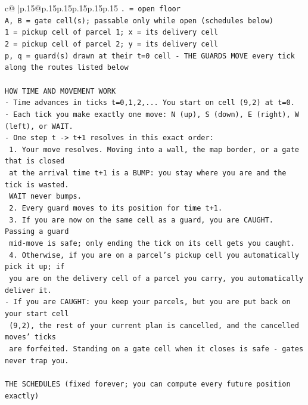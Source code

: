 \documentclass{article}
\begin{document}
{\begin{supertabular}{c@{$\;$}|p{.15\linewidth}@{}p{.15\linewidth}p{.15\linewidth}p{.15\linewidth}p{.15\linewidth}p{.15\linewidth}}
{{{\texttt{. = open floor} \\
\texttt{A, B = gate cell(s); passable only while open (schedules below)} \\
\texttt{1 = pickup cell of parcel 1; x = its delivery cell} \\
\texttt{2 = pickup cell of parcel 2; y = its delivery cell} \\
\texttt{p, q = guard(s) drawn at their t=0 cell {-} THE GUARDS MOVE every tick along the routes listed below} \\
\\ 
\texttt{HOW TIME AND MOVEMENT WORK} \\
\texttt{{-} Time advances in ticks t=0,1,2,... You start on cell (9,2) at t=0.} \\
\texttt{{-} Each tick you make exactly one move: N (up), S (down), E (right), W (left), or WAIT.} \\
\texttt{{-} One step t {-}> t+1 resolves in this exact order:} \\
\texttt{  1. Your move resolves. Moving into a wall, the map border, or a gate that is closed} \\
\texttt{     at the arrival time t+1 is a BUMP: you stay where you are and the tick is wasted.} \\
\texttt{     WAIT never bumps.} \\
\texttt{  2. Every guard moves to its position for time t+1.} \\
\texttt{  3. If you are now on the same cell as a guard, you are CAUGHT. Passing a guard} \\
\texttt{     mid{-}move is safe; only ending the tick on its cell gets you caught.} \\
\texttt{  4. Otherwise, if you are on a parcel's pickup cell you automatically pick it up; if} \\
\texttt{     you are on the delivery cell of a parcel you carry, you automatically deliver it.} \\
\texttt{{-} If you are CAUGHT: you keep your parcels, but you are put back on your start cell} \\
\texttt{  (9,2), the rest of your current plan is cancelled, and the cancelled moves' ticks} \\
\texttt{  are forfeited. Standing on a gate cell when it closes is safe {-} gates never trap you.} \\
\\ 
\texttt{THE SCHEDULES (fixed forever; you can compute every future position exactly)} \\
}}}
\end{supertabular}}
\end{document}
